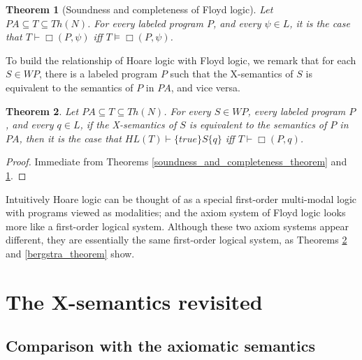 \documentclass[a4paper,11pt]{article}
\begin{document}
\theoremstyle{plain}
\newtheorem{soundness_and_completeness_of_Floyd_Hoare_logic}{Theorem}[subsection]
\begin{soundness_and_completeness_of_Floyd_Hoare_logic}[Soundness and completeness of Floyd logic]\label{soundness_and_completeness_of_Floyd_Hoare_logic}
  Let $PA \subseteq T \subseteq Th(N)$. For every labeled program $P$, and every $\psi \in L$, it is the case that $T\vdash\Box(P, \psi)$ iff $T\models\Box(P, \psi)$.
\end{soundness_and_completeness_of_Floyd_Hoare_logic}

To build the relationship of Hoare logic with Floyd logic, we remark that for each $S\in WP$, there is a labeled program $P$ such that the X-semantics of $S$ is equivalent to the semantics of $P$ in $PA$, and vice versa.

\newtheorem{relationship_of_Hoare_logic_with _Floyd_Hoare_logic}[soundness_and_completeness_of_Floyd_Hoare_logic]{Theorem}
\begin{relationship_of_Hoare_logic_with _Floyd_Hoare_logic}\label{relationship_of_Hoare_logic_with _Floyd_Hoare_logic}
  Let $PA \subseteq T \subseteq Th(N)$. For every $S\in WP$, every labeled program $P$, and every $q\in L$, if the X-semantics of $S$ is equivalent to the semantics of $P$ in $PA$, then it is the case that $HL(T)\vdash \{true\} S \{q\}$ iff $T\vdash \Box(P,q)$.
\end{relationship_of_Hoare_logic_with _Floyd_Hoare_logic}
\begin{proof}
  Immediate from Theorems \ref{soundness_and_completeness_theorem} and \ref{soundness_and_completeness_of_Floyd_Hoare_logic}.
\end{proof}

Intuitively Hoare logic can be thought of as a special first-order multi-modal logic with programs viewed as modalities; and the axiom system of Floyd logic looks more like a first-order logical system. Although these two axiom systems appear different, they are essentially the same first-order logical system, as Theorems \ref{relationship_of_Hoare_logic_with _Floyd_Hoare_logic} and \ref{bergstra_theorem} show.

\section{The X-semantics revisited}

\subsection{Comparison with the axiomatic semantics}\label{comparison_with_the_axiomatic_semantics}
\end{document}
